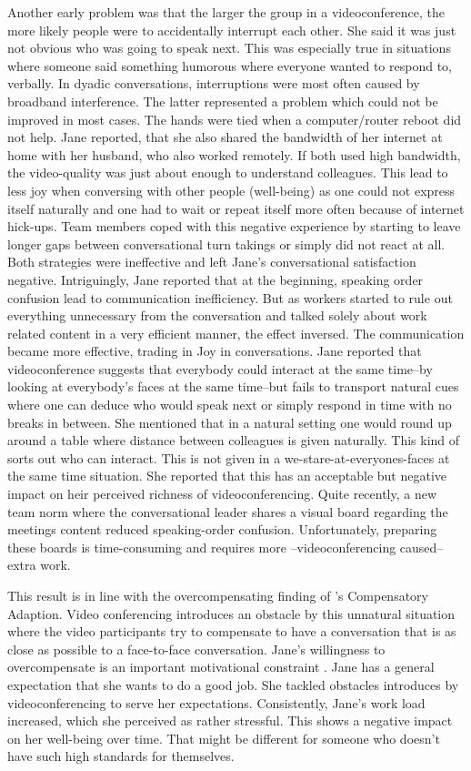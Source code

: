 \documentclass[man]{apa7}
\begin{document}
Another early problem was that the larger the group in a videoconference, the more likely people were to accidentally interrupt each other. She said it was just not obvious who was going to speak next. This was especially true in situations where someone said something humorous where everyone wanted to respond to, verbally. In dyadic conversations, interruptions were most often caused by broadband interference. The latter represented a problem which could not be improved in most cases. The hands were tied when a computer/router reboot did not help. Jane reported, that she also shared the bandwidth of her internet at home with her husband, who also worked remotely. If both used high bandwidth, the video-quality was just about enough to understand colleagues. This lead to less joy when conversing with other people (well-being) as one could not express itself naturally and one had to wait or repeat itself more often because of internet hick-ups. Team members coped with this negative experience by starting to leave longer gaps between conversational turn takings or simply did not react at all. Both strategies were ineffective and left Jane's conversational satisfaction negative. Intriguingly, Jane reported that at the beginning, speaking order confusion lead to communication inefficiency. But as workers started to rule out everything unnecessary from the conversation and talked solely about work related content in a very efficient manner, the effect inversed. The communication became more effective, trading in Joy in conversations. Jane reported that videoconference suggests that everybody could interact at the same time–by looking at everybody's faces at the same time–but fails to transport natural cues where one can deduce who would speak next or simply respond in time with no breaks in between. She mentioned that in a natural setting one would round up around a table where distance between colleagues is given naturally. This kind of sorts out who can interact. This is not given in a we-stare-at-everyones-faces at the same time situation. She reported that this has an acceptable but negative impact on heir perceived richness of videoconferencing. Quite recently, a new team norm where the conversational leader shares a visual board regarding the meetings content reduced speaking-order confusion. Unfortunately, preparing these boards is time-consuming and requires more –videoconferencing caused– extra work.

This result is in line with the overcompensating finding of \citeauthor{Kock2005}'s Compensatory Adaption. Video conferencing introduces an obstacle by this unnatural situation where the video participants try to compensate to have a conversation that is as close as possible to a face-to-face conversation. Jane's willingness to overcompensate is an important motivational constraint \parencite{Kock2001}. Jane has a general expectation that she wants to do a good job. She tackled obstacles introduces by videoconferencing to serve her expectations. Consistently, Jane's work load increased, which she perceived as rather stressful. This shows a negative impact on her well-being over time. That might be different for someone who doesn't have such high standards for themselves.
\end{document}

